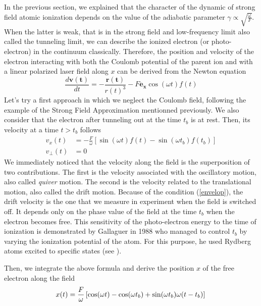 \documentclass[a4paper]{article}
\begin{document}
In the previous section, we explained that the character of the dynamic of strong field atomic ionization depends on the value of the adiabatic parameter $\gamma \propto \sqrt{\frac{\omega}{F}}$. When the latter is weak, that is in the strong field and low-frequency limit also called the tunneling limit, we can describe the ionized electron (or photo-electron) in the continuum classically. Therefore, the position and velocity of the electron interacting with both the Coulomb potential of the parent ion and with a linear polarized laser field along $x$ can be derived from the Newton equation
\begin{equation}
\frac{d \mathbf{v(t)}}{dt}=-\frac{\mathbf{r(t)}}{r(t)^{3}}-F\mathbf{e_{x}}\cos(\omega t) f(t) 
\end{equation}
Let's try a first approach in which we neglect the Coulomb field, following the example of the Strong Field Approximation mentionned previously. We also consider that the electron after tunneling out at the time $t_{b}$ is at rest. Then, its velocity at a time $t>t_{b}$ follows
\begin{align}
\label{velocity_free_motion}
v_{x}(t)&=-\frac{F}{\omega}\left[\sin(\omega t) f(t)-\sin(\omega t_{b}) f(t_{b})\right] \\
v_{\perp}(t)&=0
\end{align}
We immediately noticed that the velocity along the field is the superposition of two contributions. The first is the velocity associated with the oscillatory motion, also called \textit{quiver} motion. The second is the velocity related to the translational motion, also called the drift motion. Because of the condition (\ref{envelop}), the drift velocity is the one that we measure in experiment when the field is switched off. It depends only on the phase value of the field at the time $t_{b}$ when the electron becomes free. This sensitivity of the photo-electron energy to the time of ionization is demonstrated by Gallaguer in 1988 who managed to control $t_{b}$ by varying the ionization potential of the atom. For this purpose, he used Rydberg atoms excited to specific states (see \cite{Gallagher_1988}).
\par
Then, we integrate the above formula and derive the position $x$ of the free electron along the field
\begin{equation}
\label{position_free_motion}
x(t)=\frac{F}{\omega}\left[\cos(\omega t)-\cos(\omega t_{b})+\sin(\omega t_{b})\omega(t-t_{b})\right] \\
\end{equation}
\end{document}

